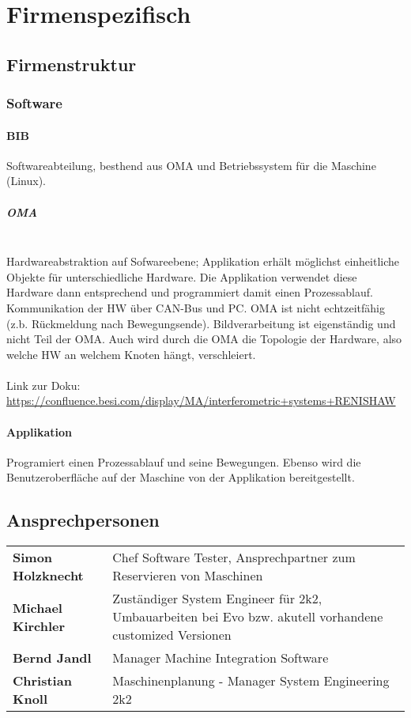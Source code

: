 \section{Firmenspezifisch}
	\subsection{Firmenstruktur}
		\subsubsection{Software}
			\paragraph{BIB}
				Softwareabteilung, besthend aus OMA und Betriebssystem für die Maschine (Linux).
				\subparagraph{OMA}\leavevmode\\
					Hardwareabstraktion auf Sofwareebene; Applikation erhält möglichst einheitliche Objekte für unterschiedliche Hardware. Die Applikation verwendet diese Hardware dann entsprechend und programmiert damit einen Prozessablauf. Kommunikation der HW über CAN-Bus und PC. OMA ist nicht echtzeitfähig (z.b. Rückmeldung nach Bewegungsende). Bildverarbeitung ist eigenständig und nicht Teil der OMA. Auch wird durch die OMA die Topologie der Hardware, also welche HW an welchem Knoten hängt, verschleiert. \\\\
					Link zur Doku: \hyperlink{dsf}{https://confluence.besi.com/display/MA/interferometric+systems+RENISHAW}
			\paragraph{Applikation}
				Programiert einen Prozessablauf und seine Bewegungen. Ebenso wird die Benutzeroberfläche auf der Maschine von der Applikation bereitgestellt.
	\subsection{Ansprechpersonen}
		\begin{tabular}{l|p{13cm}}
			\rowcolor{gray!10!white}
			\textbf{Simon Holzknecht} & Chef Software Tester, Ansprechpartner zum Reservieren von Maschinen \\
			\rowcolor{gray!00!white}
			\textbf{Michael Kirchler} & Zuständiger System Engineer für 2k2, Umbauarbeiten bei Evo bzw. akutell vorhandene customized Versionen \\
			\rowcolor{gray!10!white}
			\textbf{Bernd Jandl} & Manager Machine Integration Software\\
			\rowcolor{gray!0!white}
			\textbf{Christian Knoll} & Maschinenplanung - Manager System Engineering 2k2 \\
		\end{tabular}